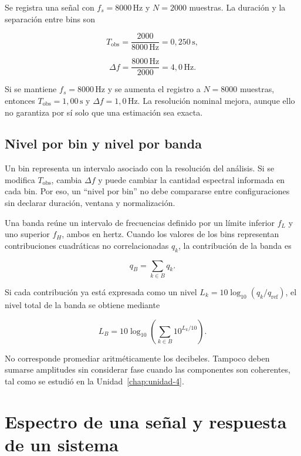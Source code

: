Se registra una señal con \(f_s=8000\,\text{Hz}\) y \(N=2000\) muestras.
La duración y la separación entre bins son

\[
    T_\mathrm{obs}=\frac{2000}{8000\,\text{Hz}}
                  =0{,}250\,\text{s},
\]

\[
    \Delta f=\frac{8000\,\text{Hz}}{2000}
            =4{,}0\,\text{Hz}.
\]

Si se mantiene \(f_s=8000\,\text{Hz}\) y se aumenta el registro a
\(N=8000\) muestras, entonces \(T_\mathrm{obs}=1{,}00\,\text{s}\) y
\(\Delta f=1{,}0\,\text{Hz}\). La resolución nominal mejora, aunque ello no
garantiza por sí solo que una estimación sea exacta.

\subsection{Nivel por bin y nivel por banda}
\label{sec:u5-bin-banda}

Un bin representa un intervalo asociado con la resolución del análisis. Si se
modifica \(T_\mathrm{obs}\), cambia \(\Delta f\) y puede cambiar la cantidad
espectral informada en cada bin. Por eso, un ``nivel por bin'' no debe
compararse entre configuraciones sin declarar duración, ventana y
normalización.

Una banda reúne un intervalo de frecuencias definido por un límite inferior
\(f_L\) y uno superior \(f_H\), ambos en hertz. Cuando los valores de los bins
representan contribuciones cuadráticas no correlacionadas \(q_k\), la
contribución de la banda es

\begin{equation}
    q_B=\sum_{k\in B}q_k.
    \label{eq:u5-suma-bins}
\end{equation}

Si cada contribución ya está expresada como un nivel
\(L_k=10\log_{10}(q_k/q_\mathrm{ref})\), el nivel total de la banda se obtiene
mediante

\begin{equation}
    L_B=10\log_{10}
    \left(\sum_{k\in B}10^{L_k/10}\right).
    \label{eq:u5-nivel-banda}
\end{equation}

No corresponde promediar aritméticamente los decibeles. Tampoco deben sumarse
amplitudes sin considerar fase cuando las componentes son coherentes, tal como
se estudió en la Unidad~\ref{chap:unidad-4}.

\section{Espectro de una señal y respuesta de un sistema}
\label{sec:u5-espectro-respuesta}

